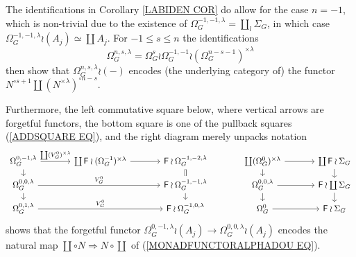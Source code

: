 \documentclass[a4paper,10pt]{article}%
\begin{document}
\begin{remark}
      \label{NPXY_REM}
The identifications in Corollary \ref{LABIDEN COR} do allow for the case $n=-1$,
which is non-trivial due to the existence of
 $\Omega_G^{-1,-1,\lambda} = \coprod_l \Sigma_G$,
 in which case $\Omega_G^{-1,-1,\lambda} \wr (A_j) \simeq \coprod A_j$.
For $-1\leq s \leq n$ the identifications
\[
	\Omega_G^{n,s,\lambda} =
	\Omega_G^{s} \wr \Omega_G^{-1,-1} \wr (\Omega_G^{n-s-1})^{\times \lambda}
\]
then show that 
$\Omega_G^{n,s,\lambda} \wr (\minus)$
encodes (the underlying category of) the functor
$N^{\circ s+1} \coprod (N^{\times \lambda})^{\circ n-s}$.

Furthermore, the left commutative square below, where vertical arrows are forgetful functors,
the bottom square is one of the pullback squares 
(\ref{ADDSQUARE EQ}), and the right diagram merely unpacks notation
\begin{equation}\label{NATCOP EQ}
\begin{tikzcd}[column sep = 3.5em,row sep = 0.8em]
	\Omega^{0,-1,\lambda}_G 
	\ar{r}{\coprod (V_G^0)^{\times \lambda}} \ar{d} &
	\coprod \Fin \wr (\Omega_G^{-1})^{\times \lambda} \ar{r} & 
	\Fin \wr \Omega_G^{-1,-2,\lambda} \ar[equal]{d} 
&
	\coprod (\Omega^0_G)^{\times \lambda} \ar{r} \ar{d} &
	\coprod \Fin \wr \Sigma_G \ar{d}
\\
	\Omega^{0,0,\lambda}_G \ar{rr}{V_G^0} \ar{d} &&
	\Fin \wr \Omega_G^{-1,-1,\lambda} \ar{d}
&
	\Omega_G^{0,0,\lambda} \ar{r} \ar{d} & 
	\Fin \wr \coprod \Sigma_G \ar{d}
\\
	\Omega^{0,1,\lambda}_G \ar{rr}{V_G^0} &&
	 \Fin \wr \Omega_G^{-1,0,\lambda}
&
	\Omega_G^0 \ar{r} &
	 \Fin \wr \Sigma_G
\end{tikzcd}
\end{equation}
shows that the forgetful functor
$\Omega_G^{0,-1,\lambda} \wr (A_j) \to 
\Omega_G^{0,0,\lambda} \wr (A_j)$
encodes the natural map
$\coprod \circ N \Rightarrow N \circ \coprod $
of (\ref{MONADFUNCTORALPHADOU EQ}).
\end{remark}
\end{document}
